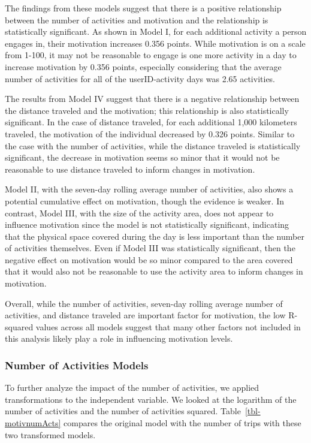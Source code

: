 \documentclass[
  letterpaper,
  number,
  review,
  3p]{elsarticle}
\begin{document}
The findings from these models suggest that there is a positive
relationship between the number of activities and motivation and the
relationship is statistically significant. As shown in Model I, for each
additional activity a person engages in, their motivation increases
0.356 points. While motivation is on a scale from 1-100, it may not be
reasonable to engage is one more activity in a day to increase
motivation by 0.356 points, especially considering that the average
number of activities for all of the userID-activity days was 2.65
activities.

The results from Model IV suggest that there is a negative relationship
between the distance traveled and the motivation; this relationship is
also statistically significant. In the case of distance traveled, for
each additional 1,000 kilometers traveled, the motivation of the
individual decreased by 0.326 points. Similar to the case with the
number of activities, while the distance traveled is statistically
significant, the decrease in motivation seems so minor that it would not
be reasonable to use distance traveled to inform changes in motivation.

Model II, with the seven-day rolling average number of activities, also
shows a potential cumulative effect on motivation, though the evidence
is weaker. In contrast, Model III, with the size of the activity area,
does not appear to influence motivation since the model is not
statistically significant, indicating that the physical space covered
during the day is less important than the number of activities
themselves. Even if Model III was statistically significant, then the
negative effect on motivation would be so minor compared to the area
covered that it would also not be reasonable to use the activity area to
inform changes in motivation.

Overall, while the number of activities, seven-day rolling average
number of activities, and distance traveled are important factor for
motivation, the low R-squared values across all models suggest that many
other factors not included in this analysis likely play a role in
influencing motivation levels.

\subsubsection{Number of Activities
Models}\label{number-of-activities-models}

To further analyze the impact of the number of activities, we applied
transformations to the independent variable. We looked at the logarithm
of the number of activities and the number of activities squared.
Table~\ref{tbl-motivnumActs} compares the original model with the number
of trips with these two transformed models.
\end{document}
